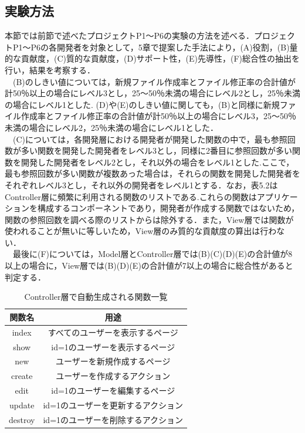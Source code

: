 \documentclass{funthesis}
\begin{document}
\subsection{実験方法}
本節では前節で述べたプロジェクトP1〜P6の実験の方法を述べる．プロジェクトP1〜P6の各開発者を対象として，5章で提案した手法により，(A)役割，(B)量的な貢献度，(C)質的な貢献度，(D)サポート性，(E)先導性，(F)総合性の抽出を行い，結果を考察する．
\\　(B)のしきい値については，新規ファイル作成率とファイル修正率の合計値が計50％以上の場合にレベル3とし，25〜50％未満の場合にレベル2とし，25％未満の場合にレベル1とした.
(D)や(E)のしきい値に関しても，(B)と同様に新規ファイル作成率とファイル修正率の合計値が計50％以上の場合にレベル3，25〜50％未満の場合にレベル2，25％未満の場合にレベル1とした．
\\　(C)については，各開発層における開発者が開発した関数の中で，最も参照回数が多い関数を開発した開発者をレベル3とし，同様に2番目に参照回数が多い関数を開発した開発者をレベル2とし，それ以外の場合をレベル1とした.ここで，最も参照回数が多い関数が複数あった場合は，それらの関数を開発した開発者をそれぞれレベル3とし，それ以外の開発者をレベル1とする．なお，表5.2はController層に頻繁に利用される関数のリストである.これらの関数はアプリケーションを構成するコンポーネントであり，開発者が作成する関数ではないため，関数の参照回数を調べる際のリストからは除外する．また，View層では関数が使われることが無いに等しいため，View層のみ質的な貢献度の算出は行わない．
\\　最後に(F)については，Model層とController層では(B)(C)(D)(E)の合計値が8以上の場合に，View層では(B)(D)(E)の合計値が7以上の場合に総合性があると判定する．

\begin{table}[htb]
  \begin{center}
    \begin{tabular}{|c||c|} \hline
      関数名 & 用途  \\ \hline
      index	& すべてのユーザーを表示するページ \\ \hline
      show & id=1のユーザーを表示するページ\\ \hline
      new & ユーザーを新規作成するページ  \\ \hline
      	create & ユーザーを作成するアクション \\ \hline
      edit & id=1のユーザーを編集するページ\\ \hline
      update & id=1のユーザーを更新するアクション \\ \hline
      destroy & id=1のユーザーを削除するアクション \\ \hline
    \end{tabular}
  \end{center}
  \caption{Controller層で自動生成される関数一覧}    \label{sample}
\end{table}
\end{document}
